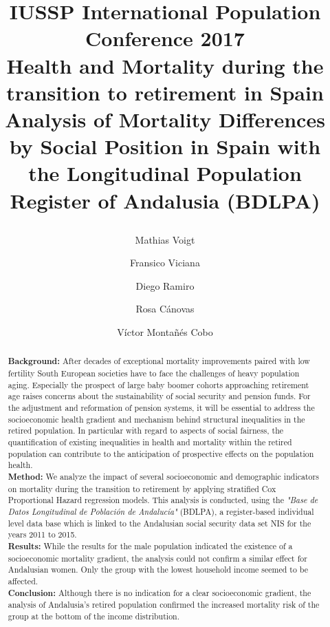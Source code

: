 \documentclass[a4paper,10pt,oneside,english]{article}
\title{\begin{center}
		\sffamily
		\large {IUSSP International Population Conference 2017}\\
		\Large{Health and Mortality during the transition to retirement in Spain}\\
		\large{Analysis of Mortality Differences by Social Position in Spain with the Longitudinal Population Register of Andalusia (BDLPA)}
\end{center}}
\author[1]{Mathias Voigt}
\author[3]{Fransico Viciana}
\author[2]{Diego Ramiro}
\author[3]{Rosa C\'{a}novas}
\author[3]{ V\'{i}ctor Monta\~{n}\'{e}s Cobo}
\affil[1]{Center for Humanities and Social Sciences, Spanish National Research Council \& Universitat Aut\`{o}noma de Barcelona}
\affil[2]{Center for Humanities and Social Sciences, Spanish National Research Council }
\affil[3]{Institute for Statistics and Cartography in Andalusia}
\begin{document}
	\date{}
	\sffamily
	\maketitle
	
\begin{abstract}
	\noindent
	\textbf{Background:} After decades of exceptional mortality improvements paired with low fertility South European societies have to face the challenges of heavy population aging. Especially the prospect of large baby boomer cohorts approaching retirement age raises concerns about the sustainability of social security and pension funds. For the adjustment and reformation of pension systems, it will be essential to address the socioeconomic health gradient and mechanism behind structural inequalities in the retired population. In particular with regard to aspects of social fairness, the quantification of existing inequalities in health and mortality within the retired population can contribute to the anticipation of prospective effects on the population health.\\
 	\textbf{Method:} We analyze the impact of several socioeconomic and demographic indicators on mortality during the transition to retirement by applying stratified Cox Proportional Hazard regression models. This analysis is conducted, using the \emph{"Base de Datos Longitudinal de Poblaci\'{o}n de Andaluc\'{i}a"} (BDLPA), a register-based individual level data base which is linked to the Andalusian social security data set NIS for the years 2011 to 2015.\\
 	\textbf{Results:} While the results for the male population indicated the existence of a socioeconomic mortality gradient, the analysis could not confirm a similar effect for Andalusian women. Only the group with the lowest household income seemed to be affected.\\
 	\textbf{Conclusion:} Although there is no indication for a clear socioeconomic gradient, the analysis of Andalusia's retired population confirmed the increased mortality risk of the group at the bottom of the income distribution.
\end{abstract}
\end{document}
